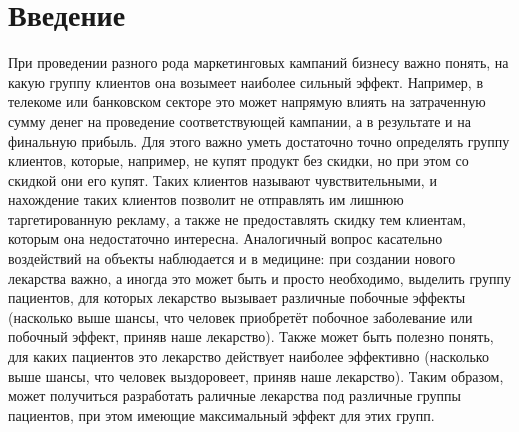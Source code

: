 \section{Введение}
\label{sec:intro}


\iffalse

\subsection{Ключевые термины и обозначения}
\subsection{Бизнес-проблема}
\subsection{Область исследований}

\fi


При проведении разного рода маркетинговых кампаний бизнесу важно понять, на какую группу клиентов она возымеет наиболее сильный эффект. Например, в телекоме или банковском секторе это может напрямую влиять на затраченную сумму денег на проведение соответствующей кампании, а в результате и на финальную прибыль. Для этого важно уметь достаточно точно определять группу клиентов, которые, например, не купят продукт без скидки, но при этом со скидкой они его купят. Таких клиентов называют чувствительными, и нахождение таких клиентов позволит не отправлять им лишнюю таргетированную рекламу, а также не предоставлять скидку тем клиентам, которым она недостаточно интересна. Аналогичный вопрос касательно воздействий на объекты наблюдается и в медицине: при создании нового лекарства важно, а иногда это может быть и просто необходимо, выделить группу пациентов, для которых лекарство вызывает различные побочные эффекты (насколько выше шансы, что человек приобретёт побочное заболевание или побочный эффект, приняв наше лекарство). Также может быть полезно понять, для каких пациентов это лекарство действует наиболее эффективно (насколько выше шансы, что человек выздоровеет, приняв наше лекарство). Таким образом, может получиться разработать раличные лекарства под различные группы пациентов, при этом имеющие максимальный эффект для этих групп.

